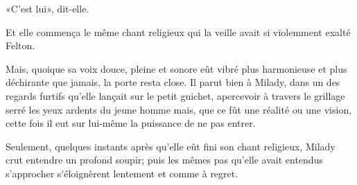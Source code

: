 «C'est lui», dit-elle. 

Et elle commença le même chant religieux qui la veille avait si violemment exalté Felton. 

Mais, quoique sa voix douce, pleine et sonore eût vibré plus harmonieuse et plus déchirante que jamais, la porte resta close. Il parut bien à Milady, dans un des regards furtifs qu'elle lançait sur le petit guichet, apercevoir à travers le grillage serré les yeux ardents du jeune homme mais, que ce fût une réalité ou une vision, cette fois il eut sur lui-même la puissance de ne pas entrer. 

Seulement, quelques instants après qu'elle eût fini son chant religieux, Milady crut entendre un profond soupir; puis les mêmes pas qu'elle avait entendus s'approcher s'éloignèrent lentement et comme à regret. 